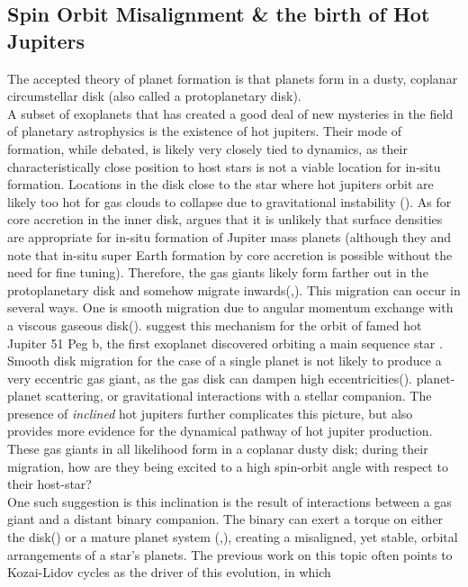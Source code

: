 \documentclass[manuscript]{aastex631}
\begin{document}
\subsection{Spin Orbit Misalignment \& the birth of Hot Jupiters}
The accepted theory of planet formation is that planets form in a dusty, coplanar circumstellar disk (also called a protoplanetary
disk). \\
A subset of exoplanets that has created a good deal of new mysteries in the field of planetary astrophysics is the 
existence of hot jupiters. Their mode of formation, while debated, is likely very closely tied to dynamics, 
as their characteristically close position to host stars is not a viable location for in-situ formation. Locations in the disk close to the star
where hot jupiters orbit are likely too hot for gas clouds to collapse due to gravitational instability (\cite{raf05}). As for core accretion in the inner disk,
\cite{lee16} argues that it is unlikely that surface densities are appropriate for in-situ formation of Jupiter mass planets (although they 
and \cite{chi13} note that in-situ super Earth formation
by core accretion is possible without the need for fine tuning). Therefore, 
the gas giants likely form farther out in the protoplanetary disk and somehow migrate inwards(\cite{lee16},).  This migration can occur in several ways. One is 
smooth migration due to angular momentum exchange with a viscous gaseous disk(\cite{gol80}). \cite{lin96} suggest 
this mechanism for the orbit of famed hot Jupiter 51 Peg b, the first exoplanet discovered orbiting 
a main sequence star \cite{may95}. Smooth disk migration for the case of a single planet is not likely to produce a very eccentric gas giant, as the gas 
disk can dampen high eccentricities(\cite{duf15}).
planet-planet scattering, or gravitational interactions with a stellar companion.
The presence of \textit{inclined} hot jupiters further complicates this picture, but also provides more evidence for the dynamical pathway of hot jupiter production. 
These gas giants in all likelihood form in a coplanar dusty disk; during their migration, how are they being excited 
to a high spin-orbit angle with respect to their host-star?\\ 
One such suggestion is this inclination is the result of interactions between a gas giant and a distant binary companion. 
The binary can exert a torque on either the disk(\cite{bat12}) or a mature planet system (\cite{kai11},\cite{dro20}), creating a misaligned, yet stable, 
orbital arrangements of a star's planets. The previous work on this topic often points to Kozai-Lidov cycles as the driver of this evolution, in which
\end{document}
